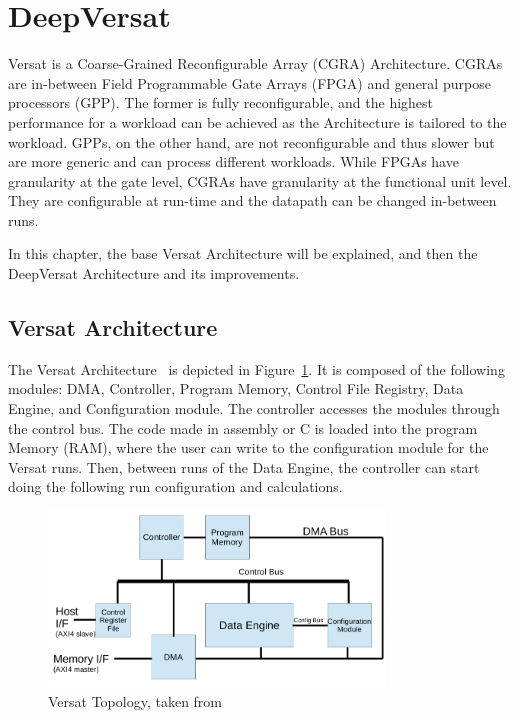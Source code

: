 \section{DeepVersat}
\label{sector:DeepVersat}

\quad Versat is a Coarse-Grained Reconfigurable Array (CGRA) Architecture. CGRAs are in-between Field Programmable Gate Arrays (FPGA)
 and general purpose processors (GPP).
The former is fully reconfigurable, and the highest performance for a workload can be achieved as the Architecture is tailored to the workload.
GPPs, on the other hand, are not reconfigurable and thus slower but are more generic and can process different workloads.
While FPGAs have granularity at the gate level, CGRAs have granularity at the functional unit level. They are configurable at run-time and the datapath can be
changed in-between runs.   

In this chapter, the base Versat Architecture will be explained, and then the DeepVersat Architecture
 and its improvements.

\subsection{Versat Architecture}

\quad The Versat Architecture~\cite{sousa:compiler,sousa:controller,sousa:FFT,sousa:versat2016} 
is depicted in Figure~\ref{figure:oldversat}. It is composed of the following modules: DMA, Controller, Program Memory, Control File Registry, Data Engine, and Configuration module.
The controller accesses the modules through the control bus. The code made in assembly or C is loaded into the program Memory (RAM), where the user
can write to the configuration module for the Versat runs. Then, between runs of the Data Engine,
 the controller can start doing the following run configuration and calculations.


\begin{figure}[!htbp]
    \centering
    \includegraphics[width=0.8\textwidth]{Figures/top.png}
    \caption{Versat Topology, taken from~\cite{sousa:controller}}
    \label{figure:oldversat}
\end{figure} 

